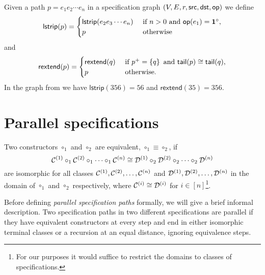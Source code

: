 Given a path $p = e_1e_2\dotsm e_n$ in a specification graph $(V,E,r,\textsf{src},\textsf{dst},\textsf{op})$ we define
\[
     \textsf{lstrip}(p) = \begin{cases} \textsf{lstrip}(e_2e_3\dotsm e_n) & \text{ if } n > 0 \text{ and } \textsf{op}(e_1) = \mathbf{1}^\circ,\\
     p & \text{ otherwise}
     \end{cases}
\]
and
\[
    \textsf{rextend}(p) = \begin{cases}
        \textsf{rextend}(q) & \text{ if } p^+ = \left\{q\right\} \text{ and } \textsf{tail}(p) \cong \textsf{tail}(q),\\
        p & \text{ otherwise}.
    \end{cases}
\]
In the graph from  we have $\textsf{lstrip}(356) = 56$ and $\textsf{rextend}(35) = 356$.

\section{Parallel specifications}
\begin{definition}
Two constructors $\circ_1$ and $\circ_2$ are equivalent, $\circ_1 \equiv \circ_2$, if
\[
    \mathcal{C}^{\left(1\right)} \circ_1 \mathcal{C}^{\left(2\right)} \circ_1 \dotsm \circ_1 \mathcal{C}^{\left(n\right)} \cong \mathcal{D}^{\left(1\right)} \circ_2 \mathcal{D}^{\left(2\right)} \circ_2 \dotsm \circ_2 \mathcal{D}^{\left(n\right)}
\]
are isomorphic for all classes $\mathcal{C}^{\left(1\right)},\mathcal{C}^{\left(2\right)},\dotsc,\mathcal{C}^{\left(n\right)}$ and $\mathcal{D}^{\left(1\right)},\mathcal{D}^{\left(2\right)},\dotsc,\mathcal{D}^{\left(n\right)}$ in the domain of $\circ_1$ and $\circ_2$ respectively, where $\mathcal{C}^{\left(i\right)}\cong\mathcal{D}^{\left(i\right)}$ for $i \in [n]$\footnote{For our purposes it would suffice to restrict the domains to classes of specifications.}.
\end{definition}

Before defining \emph{parallel specification paths} formally, we will give a brief informal description. Two specification paths in two different specifications are parallel if they have equivalent constructors at every step and end in either isomorphic terminal classes or a recursion at an equal distance, ignoring equivalence steps.


